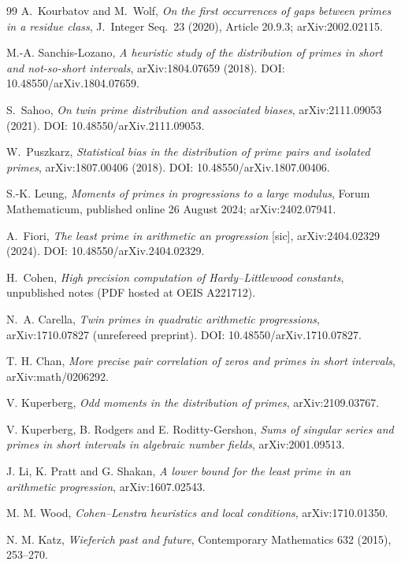\documentclass[11pt]{article}
\theoremstyle{definition}
\begin{document}
\begin{thebibliography}{99}
 A.~Kourbatov and M.~Wolf,
\emph{On the first occurrences of gaps between primes in a residue
class}, J.~Integer Seq.\ 23 (2020), Article 20.9.3; arXiv:2002.02115.

 M.-A. Sanchis-Lozano,
\emph{A heuristic study of the distribution of primes in short and
not-so-short intervals}, arXiv:1804.07659 (2018).
DOI: 10.48550/arXiv.1804.07659.

 S.~Sahoo,
\emph{On twin prime distribution and associated biases},
arXiv:2111.09053 (2021).  DOI: 10.48550/arXiv.2111.09053.

 W.~Puszkarz,
\emph{Statistical bias in the distribution of prime pairs and isolated
primes}, arXiv:1807.00406 (2018).  DOI: 10.48550/arXiv.1807.00406.

 S.-K. Leung,
\emph{Moments of primes in progressions to a large modulus},
Forum Mathematicum, published online 26 August 2024;
arXiv:2402.07941.

 A.~Fiori,
\emph{The least prime in arithmetic an progression} [sic],
arXiv:2404.02329 (2024).  DOI: 10.48550/arXiv.2404.02329.

 H.~Cohen,
\emph{High precision computation of Hardy--Littlewood constants},
unpublished notes (PDF hosted at OEIS A221712).

 N.~A. Carella,
\emph{Twin primes in quadratic arithmetic progressions},
arXiv:1710.07827 (unrefereed preprint).
DOI: 10.48550/arXiv.1710.07827.


 T. H. Chan,
\emph{More precise pair correlation of zeros and primes in short intervals},
arXiv:math/0206292.

 V. Kuperberg,
\emph{Odd moments in the distribution of primes}, arXiv:2109.03767.

 V. Kuperberg, B. Rodgers and E. Roditty-Gershon,
\emph{Sums of singular series and primes in short intervals in algebraic number fields},
arXiv:2001.09513.

 J. Li, K. Pratt and G. Shakan,
\emph{A lower bound for the least prime in an arithmetic progression}, arXiv:1607.02543.

 M. M. Wood,
\emph{Cohen--Lenstra heuristics and local conditions}, arXiv:1710.01350.

 N. M. Katz,
\emph{Wieferich past and future}, Contemporary Mathematics 632 (2015), 253--270.


\end{thebibliography}
\end{document}
